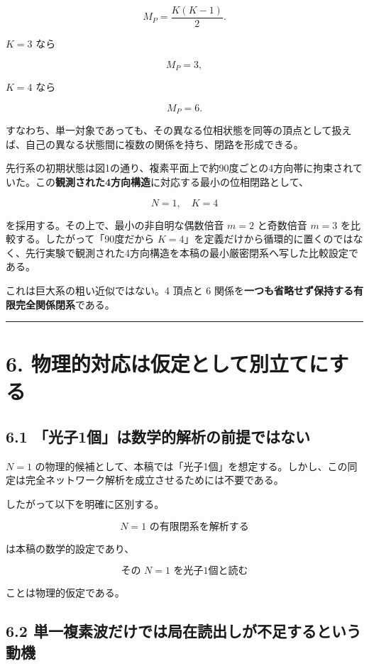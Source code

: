 \documentclass[
  a4paper,
]{ltjsarticle}
\begin{document}
\[
M_P
=
\frac{K(K-1)}{2}.
\]

\(K=3\) なら

\[
M_P
=
3,
\]

\(K=4\) なら

\[
M_P
=
6.
\]

すなわち、単一対象であっても、その異なる位相状態を同等の頂点として扱えば、自己の異なる状態間に複数の関係を持ち、閉路を形成できる。

先行系の初期状態は図1の通り、複素平面上で約90度ごとの4方向帯に拘束されていた。この\textbf{観測された4方向構造}に対応する最小の位相閉路として、

\[
\boxed{N=1,\quad K=4}
\]

を採用する。その上で、最小の非自明な偶数倍音 \(m=2\) と奇数倍音 \(m=3\)
を比較する。したがって「90度だから
\(K=4\)」を定義だけから循環的に置くのではなく、先行実験で観測された4方向構造を本稿の最小厳密閉系へ写した比較設定である。

これは巨大系の粗い近似ではない。4 頂点と 6
関係を\textbf{一つも省略せず保持する有限完全関係閉系}である。

\begin{center}\rule{0.5\linewidth}{0.5pt}\end{center}

\section{6.
物理的対応は仮定として別立てにする}\label{ux7269ux7406ux7684ux5bfeux5fdcux306fux4eeeux5b9aux3068ux3057ux3066ux5225ux7acbux3066ux306bux3059ux308b}

\subsection{6.1
「光子1個」は数学的解析の前提ではない}\label{ux5149ux5b501ux500bux306fux6570ux5b66ux7684ux89e3ux6790ux306eux524dux63d0ux3067ux306fux306aux3044}

\(N=1\)
の物理的候補として、本稿では「光子1個」を想定する。しかし、この同定は完全ネットワーク解析を成立させるためには不要である。

したがって以下を明確に区別する。

\[
\boxed{
N=1\text{ の有限閉系を解析する}
}
\]

は本稿の数学的設定であり、

\[
\boxed{\text{その }N=1\text{ を光子1個と読む}}
\]

ことは物理的仮定である。

\subsection{6.2
単一複素波だけでは局在読出しが不足するという動機}\label{ux5358ux4e00ux8907ux7d20ux6ce2ux3060ux3051ux3067ux306fux5c40ux5728ux8aadux51faux3057ux304cux4e0dux8db3ux3059ux308bux3068ux3044ux3046ux52d5ux6a5f}
\end{document}

